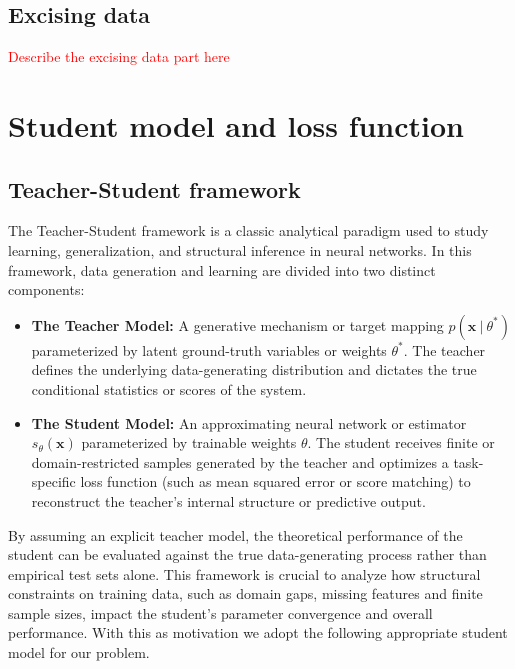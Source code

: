 \documentclass[11pt,a4paper]{article}
\theoremstyle{remark}
\newcommand{\bx}{\mathbf{x}}
\def\sgp#1{{\sf\textcolor{red}{#1}}}
\begin{document}
\begin{onehalfspace}
\subsection{Excising data}
\sgp{Describe the excising data part here}

\section{Student model and loss function}\label{sec:student_and_loss}

\subsection{Teacher-Student framework}\label{subsec:teacher_student}
The Teacher-Student framework is a classic analytical paradigm used to study learning, generalization, and structural inference in neural networks. In this framework, data generation and learning are divided into two distinct components:
\begin{itemize}
    \item \textbf{The Teacher Model:} A generative mechanism or target mapping $p(\bx \ \vert \ \theta^*)$ parameterized by latent ground-truth variables or weights $\theta^*$. The teacher defines the underlying data-generating distribution and dictates the true conditional statistics or scores of the system.
    \item \textbf{The Student Model:} An approximating neural network or estimator $s_\theta(\bx)$ parameterized by trainable weights $\theta$. The student receives finite or domain-restricted samples generated by the teacher and optimizes a task-specific loss function (such as mean squared error or score matching) to reconstruct the teacher's internal structure or predictive output.
\end{itemize}   
 By assuming an explicit teacher model, the theoretical performance of the student can be evaluated against the true data-generating process rather than empirical test sets alone. This framework is crucial to analyze how structural constraints on training data, such as domain gaps, missing features and finite sample sizes, impact the student's parameter convergence and overall performance. With this as motivation we adopt the following appropriate student model for our problem.


\end{onehalfspace}
\end{document}
